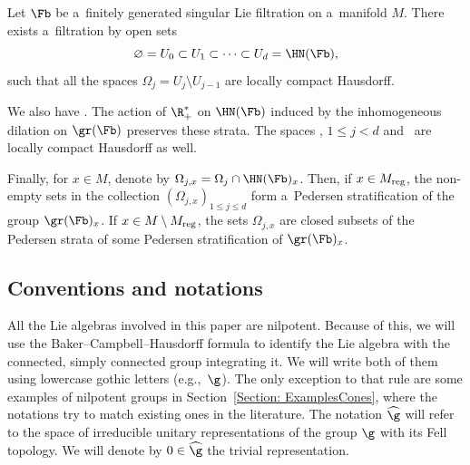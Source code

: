 \begin{thm}\label{Theorem:Stratification}
 Let $\Fb$ be a~finitely generated singular Lie filtration on a~manifold $M$. There exists a~filtration by open sets
 \[\varnothing = U_0 \subset U_1 \subset \cdots \subset U_d = \HN(\Fb),\]
 such that all the spaces $\Omega_j = U_j\setminus U_{j-1}$ are locally compact Hausdorff.

 We also have .
 The action of $\R^*_+$ on $\HN(\Fb)$ induced by the inhomogeneous dilation on $\gr(\Fb)$ preserves these strata. The spaces , $1\leq j < d$ and~ are locally compact Hausdorff as well.

 Finally, for $x\in M$, denote by $\Omega_{j,x} = \Omega_j\cap \HN(\Fb)_{x}$. Then, if $x \in M_{\rm reg}$, the non-empty sets in the collection $(\Omega_{j,x})_{1\leq j \leq d}$ form a~Pedersen stratification of the group $\gr(\Fb)_x$. If $x \in M \setminus M_{\rm reg}$, the sets $\Omega_{j,x}$ are closed subsets of the Pedersen strata of some Pedersen stratification of $\gr(\Fb)_x$.
\end{thm}






















\subsection*{Conventions and notations} All the Lie algebras involved in this paper are nilpotent. Because of this, we will use the Baker--Campbell--Hausdorff formula to identify the Lie algebra with the connected, simply connected group integrating it. We will write both of them using lowercase gothic letters (e.g.,~$\g$). The only exception to that rule are some examples of nilpotent groups in Section~\ref{Section: ExamplesCones}, where the notations try to match existing ones in the literature. The notation $\widehat{\g}$ will refer to the space of irreducible unitary representations of the group $\g$ with its Fell topology. We will denote by $0 \in \widehat{\g}$ the trivial representation.

